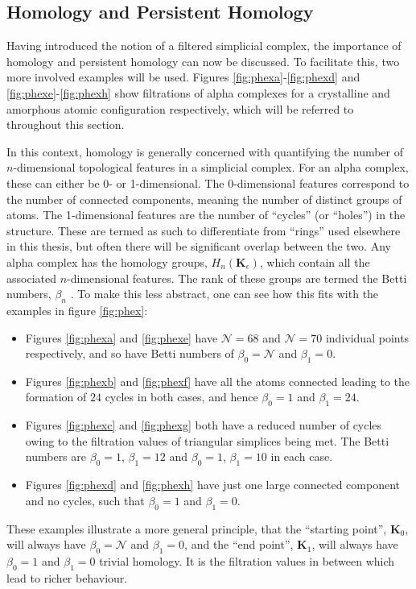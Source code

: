 \subsection{Homology and Persistent Homology}

Having introduced the notion of a filtered simplicial complex, the importance of homology and persistent homology can now be discussed.
To facilitate this, two more involved examples will be used.
Figures \ref{fig:phexa}\--\ref{fig:phexd} and \ref{fig:phexe}\--\ref{fig:phexh} show filtrations of alpha complexes for a crystalline and amorphous atomic configuration respectively, which will be referred to throughout this section.

In this context, homology is generally concerned with quantifying the number of $n$\--dimensional topological features in a simplicial complex.
For an alpha complex, these can either be 0\-- or 1\--dimensional.
The 0\--dimensional features correspond to the number of connected components, meaning the number of distinct groups of atoms.
The 1\--dimensional features are the number of ``cycles'' (or ``holes'') in the structure.
These are termed as such to differentiate from ``rings'' used elsewhere in this thesis, but often there will be significant overlap between the two.
Any alpha complex has the homology groups, $H_n\left(\mathbf{K}_\epsilon\right)$, which contain all the associated $n$\--dimensional features.
The rank of these groups are termed the Betti numbers, $\beta_n$ \cite{Zomorodian2005}.
To make this less abstract, one can see how this fits with the examples in figure \ref{fig:phex}:
\begin{itemize}
	\item Figures \ref{fig:phexa} and \ref{fig:phexe} have $\mathcal{N}=68$ and $\mathcal{N}=70$ individual points respectively, and so have Betti numbers of $\beta_0=\mathcal{N}$ and $\beta_1=0$.
	\item Figures \ref{fig:phexb} and \ref{fig:phexf} have all the atoms connected leading to the formation of $24$ cycles in both cases, and hence $\beta_0=1$ and $\beta_1=24$.
	\item Figures \ref{fig:phexc} and \ref{fig:phexg} both have a reduced number of cycles owing to the filtration values of triangular simplices being met. The Betti numbers are $\beta_0=1$, $\beta_1=12$ and $\beta_0=1$, $\beta_1=10$ in each case.
	\item Figures \ref{fig:phexd} and \ref{fig:phexh} have just one large connected component and no cycles, such that $\beta_0=1$ and $\beta_1=0$.
\end{itemize}
These examples illustrate a more general principle, that the ``starting point'', $\mathbf{K}_0$, will always have $\beta_0=\mathcal{N}$ and $\beta_1=0$, and the ``end point'', $\mathbf{K}_1$,  will always have $\beta_0=1$ and $\beta_1=0$ \ie{} trivial homology.
It is the filtration values in between which lead to richer behaviour.

